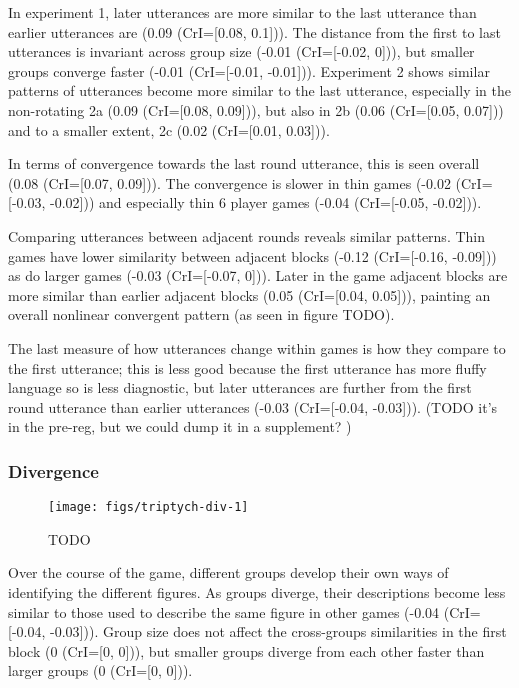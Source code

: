 \documentclass[
  english,
  a4paper,
]{article}
\begin{document}
In experiment 1, later utterances are more similar to the last utterance than earlier utterances are (0.09 (CrI={[}0.08, 0.1{]})). The distance from the first to last utterances is invariant across group size (-0.01 (CrI={[}-0.02, 0{]})), but smaller groups converge faster (-0.01 (CrI={[}-0.01, -0.01{]})). Experiment 2 shows similar patterns of utterances become more similar to the last utterance, especially in the non-rotating 2a (0.09 (CrI={[}0.08, 0.09{]})), but also in 2b (0.06 (CrI={[}0.05, 0.07{]})) and to a smaller extent, 2c (0.02 (CrI={[}0.01, 0.03{]})).

In terms of convergence towards the last round utterance, this is seen overall (0.08 (CrI={[}0.07, 0.09{]})). The convergence is slower in thin games (-0.02 (CrI={[}-0.03, -0.02{]})) and especially thin 6 player games (-0.04 (CrI={[}-0.05, -0.02{]})).

Comparing utterances between adjacent rounds reveals similar patterns. Thin games have lower similarity between adjacent blocks (-0.12 (CrI={[}-0.16, -0.09{]})) as do larger games (-0.03 (CrI={[}-0.07, 0{]})). Later in the game adjacent blocks are more similar than earlier adjacent blocks (0.05 (CrI={[}0.04, 0.05{]})), painting an overall nonlinear convergent pattern (as seen in figure TODO).

The last measure of how utterances change within games is how they compare to the first utterance; this is less good because the first utterance has more fluffy language so is less diagnostic, but later utterances are further from the first round utterance than earlier utterances (-0.03 (CrI={[}-0.04, -0.03{]})). (TODO it's in the pre-reg, but we could dump it in a supplement? )

\hypertarget{divergence}{%
\subsubsection{Divergence}\label{divergence}}

\begin{figure*}[t!]

{\centering \texttt{[image: figs/triptych-div-1]} 

}

\caption{TODO}\label{fig:triptych-div}
\end{figure*}

Over the course of the game, different groups develop their own ways of identifying the different figures. As groups diverge, their descriptions become less similar to those used to describe the same figure in other games (-0.04 (CrI={[}-0.04, -0.03{]})). Group size does not affect the cross-groups similarities in the first block (0 (CrI={[}0, 0{]})), but smaller groups diverge from each other faster than larger groups (0 (CrI={[}0, 0{]})).
\end{document}
